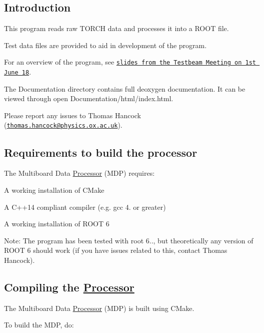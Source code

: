 \subsection*{Introduction}

This program reads raw T\+O\+R\+CH data and processes it into a R\+O\+OT file.

Test data files are provided to aid in development of the program.

For an overview of the program, see \href{https://indico.cern.ch/event/731827/contributions/3026751/attachments/1660291/2659581/Multiboard_Data_Processor.pdf}{\tt slides from the Testbeam Meeting on 1st June 18}.

The {\ttfamily Documentation} directory contains full deoxygen documentation. It can be viewed through {\ttfamily open Documentation/html/index.\+html}.

Please report any issues to Thomas Hancock (\href{mailto:thomas.hancock@physics.ox.ac.uk}{\tt thomas.\+hancock@physics.\+ox.\+ac.\+uk}).

\subsection*{Requirements to build the processor}

The Multiboard Data \hyperlink{class_processor}{Processor} (M\+DP) requires\+:


\begin{DoxyItemize}
\item A working installation of C\+Make
\item A C++14 compliant compiler (e.\+g. gcc 4. or greater)
\item A working installation of R\+O\+OT 6
\end{DoxyItemize}

Note\+: The program has been tested with root 6.., but theoretically any version of R\+O\+OT 6 should work (if you have issues related to this, contact Thomas Hancock).

\subsection*{Compiling the \hyperlink{class_processor}{Processor}}

The Multiboard Data \hyperlink{class_processor}{Processor} (M\+DP) is built using C\+Make.

To build the M\+DP, do\+: 


